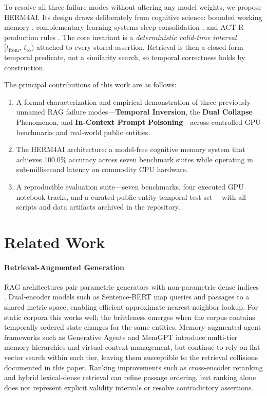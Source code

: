 \documentclass[11pt,a4paper,twocolumn]{article}
\newcommand{\herm}{\textsc{HERM4AI}}
\newcommand{\valtime}{$[t_{\text{from}},\,t_{\text{to}})$}
\newcommand{\dcolsym}{\textbf{Dual Collapse}}
\newcommand{\ticol}{\textbf{Temporal Inversion}}
\newcommand{\icpp}{\textbf{In-Context Prompt Poisoning}}
\begin{document}
To resolve all three failure modes without altering any model weights,
we propose \herm{}. Its design draws deliberately from cognitive
science: bounded working memory \citep{miller1956magical},
complementary learning systems sleep consolidation
\citep{mcclelland1995cls,diekelmann2010memory}, and ACT-R production
rules \citep{anderson1993rules}. The core invariant is a
\emph{deterministic valid-time interval} \valtime{} attached to every
stored assertion. Retrieval is then a closed-form temporal predicate,
not a similarity search, so temporal correctness holds by construction.

The principal contributions of this work are as follows:
\begin{enumerate}[label=(\roman*),leftmargin=*]
  \item A formal characterization and empirical demonstration of three
        previously unnamed RAG failure modes---\ticol{}, the \dcolsym{}
        Phenomenon, and \icpp{}---across controlled GPU benchmarks and
        real-world public entities.
  \item The \herm{} architecture: a model-free cognitive memory system
        that achieves 100.0\% accuracy across seven benchmark suites
        while operating in sub-millisecond latency on commodity CPU
        hardware.
  \item A reproducible evaluation suite---seven benchmarks, four executed
        GPU notebook tracks, and a curated public-entity temporal test set---
        with all scripts and data artifacts archived in the repository.
\end{enumerate}

\section{Related Work}
\label{sec:related}

\paragraph{Retrieval-Augmented Generation}
RAG architectures pair parametric generators with non-parametric dense
indices \citep{lewis2020rag}.  Dual-encoder models such as Sentence-BERT
\citep{reimers2019sentence} map queries and passages to a shared metric
space, enabling efficient approximate nearest-neighbor lookup.  For
static corpora this works well; the brittleness emerges when the
corpus contains temporally ordered state changes for the same entities.
Memory-augmented agent frameworks such as Generative Agents
\citep{park2023generative} and MemGPT \citep{packer2023memgpt} introduce
multi-tier memory hierarchies and virtual context management, but
continue to rely on flat vector search within each tier, leaving them
susceptible to the retrieval collisions documented in this paper.
Ranking improvements such as cross-encoder reranking and hybrid
lexical-dense retrieval can refine passage ordering, but ranking alone
does not represent explicit validity intervals or resolve contradictory
assertions.
\end{document}
